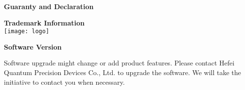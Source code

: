 \newpage
\pagestyle{fancy}
\renewcommand{\headrulewidth}{2.4pt}
\renewcommand{\footrulewidth}{2.4pt}
\chead{}
\cfoot{}
\fancyfoot[RO,LE]{\xiaosi\textbf{\thepage}}



\erhao \textbf{Guaranty and Declaration}
\vspace{0.7cm}

\sihao \textbf{Trademark Information}\\
\hspace*{0.8cm}
\hspace{-12.2cm}\texttt{[image: logo]}

\vspace{0.8cm}
\sihao\textbf{Software Version}
\vspace{0.4cm}

Software upgrade might change or add product features. Please contact Hefei Quantum Precision Devices Co., Ltd. to upgrade the software. We will take the initiative to contact you when necessary.

